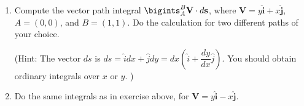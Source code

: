 \documentclass[fleqn]{article}
\begin{document}
\begin{enumerate}
\begin{enumerate}
      \end{enumerate}

    \item Compute the vector path integral $\bigints_A^B \mathbf{V}\cdot d\mathbf{s}$, where $\mathbf{V}=y \mathbf{\hat i} + x \mathbf{\hat j}$, $A=(0,0)$, and $B=(1,1)$. Do the calculation for two different paths of your choice.

    (Hint:  The vector $ds$ is $ds=\hat{i}dx+\hat{j}dy=dx(\hat{i}+\dfrac{dy}{dx} \hat{j})$.  
    You should obtain ordinary integrals over $x$ or $y$.  )

    \item Do the same integrals as in exercise above, for $\mathbf{V}=y \mathbf{\hat i} - x \mathbf{\hat j}$. 

  \end{enumerate}
\end{document}
